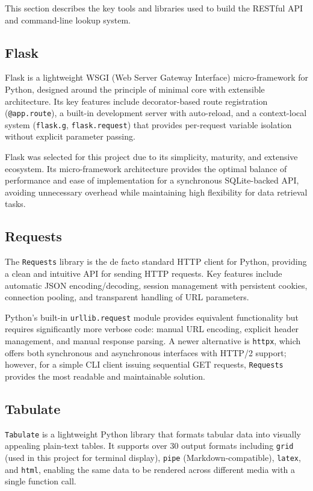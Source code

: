 \documentclass[a4paper,12pt]{report}
\begin{document}
This section describes the key tools and libraries used to build the RESTful API and command-line lookup system.

\subsection{Flask}

Flask is a lightweight WSGI (Web Server Gateway Interface) micro-framework for Python, designed around the principle of minimal core with extensible architecture. Its key features include decorator-based route registration (\texttt{@app.route}), a built-in development server with auto-reload, and a context-local system (\texttt{flask.g}, \texttt{flask.request}) that provides per-request variable isolation without explicit parameter passing.

Flask was selected for this project due to its simplicity, maturity, and extensive ecosystem. Its micro-framework architecture provides the optimal balance of performance and ease of implementation for a synchronous SQLite-backed API, avoiding unnecessary overhead while maintaining high flexibility for data retrieval tasks.

\subsection{Requests}

The \texttt{Requests} library is the de facto standard HTTP client for Python, providing a clean and intuitive API for sending HTTP requests. Key features include automatic JSON encoding/decoding, session management with persistent cookies, connection pooling, and transparent handling of URL parameters.

Python's built-in \texttt{urllib.request} module provides equivalent functionality but requires significantly more verbose code: manual URL encoding, explicit header management, and manual response parsing. A newer alternative is \texttt{httpx}, which offers both synchronous and asynchronous interfaces with HTTP/2 support; however, for a simple CLI client issuing sequential GET requests, \texttt{Requests} provides the most readable and maintainable solution.

\subsection{Tabulate}

\texttt{Tabulate} is a lightweight Python library that formats tabular data into visually appealing plain-text tables. It supports over 30 output formats including \texttt{grid} (used in this project for terminal display), \texttt{pipe} (Markdown-compatible), \texttt{latex}, and \texttt{html}, enabling the same data to be rendered across different media with a single function call.
\end{document}
